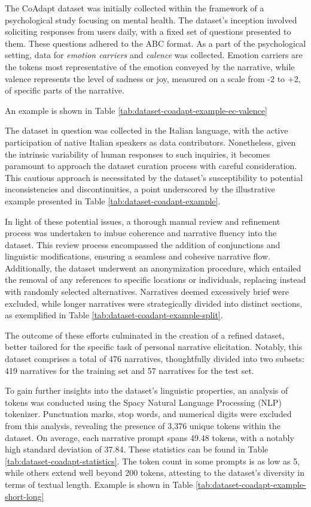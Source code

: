 The CoAdapt dataset was initially collected within the framework of a psychological study focusing on mental health. The dataset's inception involved soliciting responses from users daily, with a fixed set of questions presented to them. These questions adhered to the ABC format. As a part of the psychological setting, data for \emph{emotion carriers} and \emph{calence} was collected. Emotion carriers are the tokens most representative of the emotion conveyed by the narrative, while valence represents the level of sadness or joy, measured on a scale from -2 to +2, of specific parts of the narrative. 


An example is shown in Table \ref{tab:dataset-coadapt-example-ec-valence}

The dataset in question was collected in the Italian language, with the active participation of native Italian speakers as data contributors. Nonetheless, given the intrinsic variability of human responses to such inquiries, it becomes paramount to approach the dataset curation process with careful consideration. This cautious approach is necessitated by the dataset's susceptibility to potential inconsistencies and discontinuities, a point underscored by the illustrative example presented in Table \ref{tab:dataset-coadapt-example}.


In light of these potential issues, a thorough manual review and refinement process was undertaken to imbue coherence and narrative fluency into the dataset. This review process encompassed the addition of conjunctions and linguistic modifications, ensuring a seamless and cohesive narrative flow. Additionally, the dataset underwent an anonymization procedure, which entailed the removal of any references to specific locations or individuals, replacing instead with randomly selected alternatives. Narratives deemed excessively brief were excluded, while longer narratives were strategically divided into distinct sections, as exemplified in Table \ref{tab:dataset-coadapt-example-split}.

The outcome of these efforts culminated in the creation of a refined dataset, better tailored for the specific task of personal narrative elicitation. Notably, this dataset comprises a total of 476 narratives, thoughtfully divided into two subsets: 419 narratives for the training set and 57 narratives for the test set.


To gain further insights into the dataset's linguistic properties, an analysis of tokens was conducted using the Spacy Natural Language Processing (NLP) tokenizer. Punctuation marks, stop words, and numerical digits were excluded from this analysis, revealing the presence of 3,376 unique tokens within the dataset. On average, each narrative prompt spans 49.48 tokens, with a notably high standard deviation of 37.84. These statistics can be found in Table \ref{tab:dataset-coadapt-statistics}. 
The token count in some prompts is as low as 5, while others extend well beyond 200 tokens, attesting to the dataset's diversity in terms of textual length. Example is shown in Table \ref{tab:dataset-coadapt-example-short-long}

